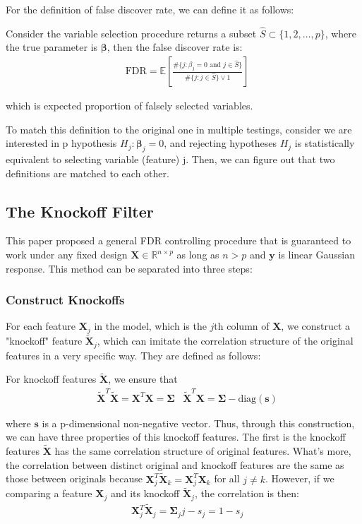\documentclass{uwstat572}
\begin{document}
For the definition of false discover rate, we can define it as follows:

\clearpage
{}

Consider the variable selection procedure returns a subset $\hat{S} \subset \{1,2,\dots, p \}$, where the true parameter is $\bm{\beta}$, then the false discover rate is:
\begin{align}
& \text{FDR} = \mathbb{E}\left[\frac{\#\{j:\beta_j = 0 \text{ and }j\in \hat{S} \} }{\#\{j: j\in \hat{S}\} \vee 1 } \right]
\end{align}

which is expected proportion of falsely selected variables. 

To match this definition to the original one in multiple testings, consider we are interested in p hypothesis $H_j: \bm{\beta}_j = 0$, and rejecting hypotheses $H_j$ is statistically equivalent to selecting variable (feature) j. Then, we can figure out that two definitions are matched to each other.

\subsection{The Knockoff Filter}
This paper proposed a general FDR controlling procedure that is guaranteed to work under any fixed design $\bm{X} \in \mathbb{R}^{n\times p}$ as long as $n>p$ and $\bm{y}$ is linear Gaussian response. This method can be separated into three steps:

\subsubsection{Construct Knockoffs}
For each feature $\bm{X}_j$ in the model, which is the $j$th column of $\bm{X}$, we construct a "knockoff" feature $\bm{\tilde X}_j$, which can imitate the correlation structure of the original features in a very specific way. They are defined as follows:

For knockoff features $\tilde {\bm{X}}$, we ensure that 
\begin{align}
& \tilde {\bm{X}}^T\tilde {\bm{X}} = \bm{X}^T\bm{X} = \bm{\Sigma} & \tilde {\bm{X}}^T\bm{X} = \bm{\Sigma} - \text{diag}{(\bm{s})}
\end{align}

where $\bm{s}$ is a p-dimensional non-negative vector. Thus, through this construction, we can have three properties of this knockoff features. The first is the knockoff features $\bm{\tilde{X}}$ has the same correlation structure of original features. What's more, the correlation between distinct original and knockoff features are the same as those between originals because $\bm{X}_j^T\tilde{\bm{X}}_k = \bm{X}_j^T\bm{X}_k$ for all $j\neq k$. However, if we comparing a feature $\bm{X}_j$ and its knockoff $\bm{\tilde X}_j$, the correlation is then:
\begin{align*}
& \bm{X}_j^T\tilde{\bm{X}}_j = \bm{\Sigma}_jj - s_j = 1-s_j
\end{align*}
\end{document}
